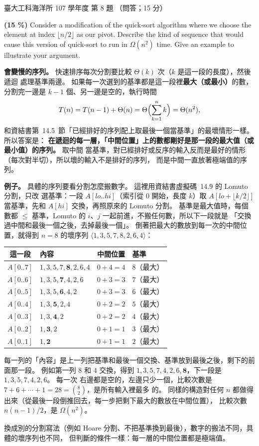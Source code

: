 \begin{pastexam}[label={px:ntu-107-esoe-ds-08}]{臺大工科海洋所 107 學年度 第 8 題}
（問答；15 分）

\textbf{(15 \%)} Consider a modification of the quick-sort algorithm where we choose the element at
index $\lfloor n/2\rfloor$ as our pivot. Describe the kind of sequence that would cause this version
of quick-sort to run in $\Omega(n^2)$ time. Give an example to illustrate your argument.
\end{pastexam}

\begin{pastsoln}
\textbf{會變慢的序列。} 快速排序每次分割要比較 $\Theta(k)$ 次（$k$ 是這一段的長度），然後遞迴
處理基準兩邊。 如果每一次選到的基準都是這一段裡\textbf{最大（或最小）}的數，分割完一邊是
$k - 1$ 個、另一邊是空的，執行時間
\[
T(n) = T(n-1) + \Theta(n) = \Theta\Bigl(\sum_{k=1}^{n} k\Bigr) = \Theta(n^2),
\]
和資結書第~14.5~節「已經排好的序列配上取最後一個當基準」的最壞情形一樣。 所以答案是：
\textbf{在遞迴的每一層，「中間位置」上的數都剛好是那一段的最大值（或最小值）的序列。} 取中間
當基準，對已經排好或反序的輸入反而是最好的情形（每次對半切），所以壞的輸入不是排好的序列，
而是中間一直放著極端值的序列。

\textbf{例子。} 具體的序列要看分割怎麼搬數字。 這裡用資結書虛擬碼~14.9 的 Lomuto 分割，只改
選基準：一段 $A[\mathit{lo}..\mathit{hi}]$（索引從 $0$ 開始，長度 $k$）取
$A[\mathit{lo} + \lfloor k/2 \rfloor]$ 當基準，先和 $A[\mathit{hi}]$ 交換，再照原來的 Lomuto 分割。
基準是最大值時，每個數都 $\le$ 基準，Lomuto 的 $i$、$j$ 一起前進，不搬任何數，所以下一段就是
「交換過中間和最後一個之後，去掉最後一個」。 倒著把最大的數放到每一次的中間位置，就得到
$n = 8$ 的壞序列 $\langle 1, 3, 5, 7, 8, 2, 6, 4 \rangle$：
\begin{center}
\small
\begin{tabular}{clcl}
\toprule
這一段 & 內容 & 中間位置 & 基準 \\
\midrule
$A[0..7]$ & $1, 3, 5, 7, \mathbf{8}, 2, 6, 4$ & $0 + 4 = 4$ & $8$（最大）\\
$A[0..6]$ & $1, 3, 5, \mathbf{7}, 4, 2, 6$ & $0 + 3 = 3$ & $7$（最大）\\
$A[0..5]$ & $1, 3, 5, \mathbf{6}, 4, 2$ & $0 + 3 = 3$ & $6$（最大）\\
$A[0..4]$ & $1, 3, \mathbf{5}, 2, 4$ & $0 + 2 = 2$ & $5$（最大）\\
$A[0..3]$ & $1, 3, \mathbf{4}, 2$ & $0 + 2 = 2$ & $4$（最大）\\
$A[0..2]$ & $1, \mathbf{3}, 2$ & $0 + 1 = 1$ & $3$（最大）\\
$A[0..1]$ & $1, \mathbf{2}$ & $0 + 1 = 1$ & $2$（最大）\\
\bottomrule
\end{tabular}
\end{center}
每一列的「內容」是上一列把基準和最後一個交換、基準放到最後之後，剩下的前面那一段。 例如第一列
$8$ 和 $4$ 交換，得到 $1, 3, 5, 7, 4, 2, 6, \mathbf{8}$，下一段是 $1, 3, 5, 7, 4, 2, 6$。 每一次
右邊都是空的，左邊只少一個，比較次數是 $7 + 6 + \cdots + 1 = 28 = \binom{8}{2}$，是所有輸入裡最多
的。 同樣的構造對任何 $n$ 都做得出來（從最後一段倒推回去，每一步把剩下最大的數放在中間位置），
比較次數 $n(n-1)/2$，是 $\Omega(n^2)$。

換成別的分割寫法（例如 Hoare 分割、不把基準換到最後），數字的搬法不同，具體的壞序列也不同，
但判斷的條件一樣：每一層的中間位置都是極端值。
\end{pastsoln}
